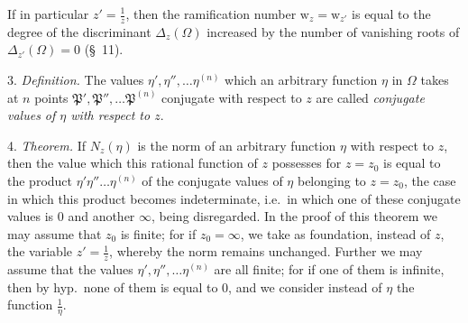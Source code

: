 \documentclass{article}
\begin{document}
If in particular $z' = \frac{1}{z}$, then the ramification number $\mathrm{w}_{z} = \mathrm{w}_{z'}$ is equal to the degree of the discriminant $\Delta_{z}(\Omega)$ increased by the number of vanishing roots of $\Delta_{z'}(\Omega) = 0$ (§~11).

3. \emph{Definition.} The values $\eta', \eta'', \ldots \eta^{(n)}$ which an arbitrary function $\eta$ in $\Omega$ takes at $n$ points $\mathfrak{P}', \mathfrak{P}'', \ldots \mathfrak{P}^{(n)}$ conjugate with respect to $z$ are called \emph{conjugate values of $\eta$ with respect to $z$}.

4. \emph{Theorem.} If $N_{z}(\eta)$ is the norm of an arbitrary function $\eta$ with respect to $z$, then the value which this rational function of $z$ possesses for $z = z_{0}$ is equal to the product $\eta'\eta''\ldots\eta^{(n)}$ of the conjugate values of $\eta$ belonging to $z = z_{0}$, the case in which this product becomes indeterminate, i.e.\ in which one of these conjugate values is 0 and another $\infty$, being disregarded. In the proof of this theorem we may assume that $z_{0}$ is finite; for if $z_{0} = \infty$, we take as foundation, instead of $z$, the variable $z' = \frac{1}{z}$, whereby the norm remains unchanged. Further we may assume that the values $\eta', \eta'', \ldots \eta^{(n)}$ are all finite; for if one of them is infinite, then by hyp.\ none of them is equal to 0, and we consider instead of $\eta$ the function $\frac{1}{\eta}$.

\end{document}
